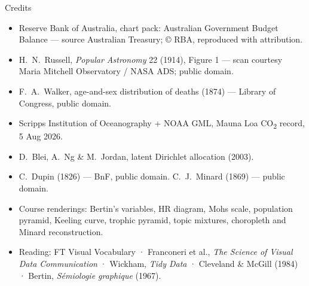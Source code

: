 \documentclass[aspectratio=169,11pt]{beamer}
\begin{document}
\begin{frame}[t]{Credits}
  \scriptsize
  \begin{itemize}
    \item Reserve Bank of Australia, chart pack: Australian Government Budget Balance — source Australian Treasury; © RBA, reproduced with attribution.
    \item H.\ N.\ Russell, \emph{Popular Astronomy} 22 (1914), Figure 1 — scan courtesy Maria Mitchell Observatory / NASA ADS; public domain.
    \item F.\ A.\ Walker, age-and-sex distribution of deaths (1874) — Library of Congress, public domain.
    \item Scripps Institution of Oceanography + NOAA GML, Mauna Loa CO\textsubscript{2} record, 5 Aug 2026.
    \item D.\ Blei, A.\ Ng \& M.\ Jordan, latent Dirichlet allocation (2003).
    \item C.\ Dupin (1826) — BnF, public domain. \quad C.\ J.\ Minard (1869) — public domain.
    \item Course renderings: Bertin's variables, HR diagram, Mohs scale, population pyramid, Keeling curve, trophic pyramid, topic mixtures, choropleth and Minard reconstruction.
    \item Reading: FT Visual Vocabulary · Franconeri et al., \emph{The Science of Visual Data Communication} · Wickham, \emph{Tidy Data} · Cleveland \& McGill (1984) · Bertin, \emph{Sémiologie graphique} (1967).
  \end{itemize}
\end{frame}
\end{document}
